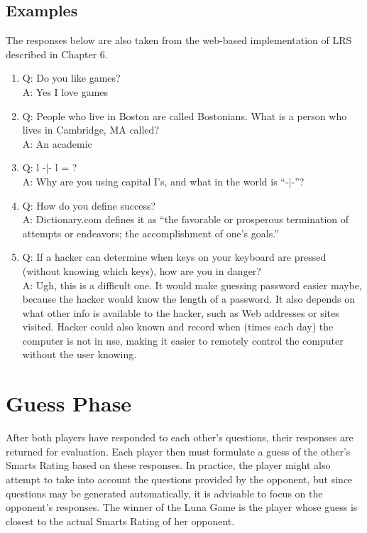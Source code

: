 \subsection{Examples}

The responses below are also taken from the web-based implementation of LRS described in Chapter 6.

\begin{enumerate}
\item Q: Do you like games? \\
A: Yes I love games
\item Q: People who live in Boston are called Bostonians. What is a person who lives in Cambridge, MA called?\\
A: An academic
\item Q: l -|- l = ?\\
A: Why are you using capital I's, and what in the world is ``-|-''?
\item Q: How do you define success?\\
A: Dictionary.com defines it as ``the favorable or prosperous termination of attempts or endeavors; the accomplishment of one's goals.''
\item Q: If a hacker can determine when keys on your keyboard are pressed (without knowing which keys), how are you in danger?\\
A: Ugh, this is a difficult one. It would make guessing password easier maybe, because the hacker would know the length of a password. It also depends on what other info is available to the hacker, such as Web addresses or sites visited. Hacker could also known and record when (times each day) the computer is not in use, making it easier to remotely control the computer without the user knowing.
\end{enumerate}

\section{Guess Phase}

After both players have responded to each other's questions, their responses are returned for evaluation. Each player then must formulate a guess of the other's Smarts Rating based on these responses. In practice, the player might also attempt to take into account the questions provided by the opponent, but since questions may be generated automatically, it is advisable to focus on the opponent's responses. The winner of the Luna Game is the player whose guess is closest to the actual Smarts Rating of her opponent.

